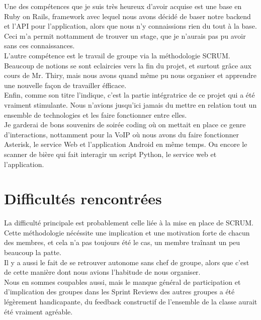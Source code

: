 \documentclass{report}
\begin{document}
	Une des compétences que je suis très heureux d'avoir acquise est une base en Ruby on Rails, framework avec lequel nous avons décidé de baser notre backend et l'API pour l'application, alors que nous n'y connaissions rien du tout à la base.\\
	Ceci m'a permit nottamment de trouver un stage, que je n'aurais pas pu avoir sans ces connaissances.\\

	L'autre compétence est le travail de groupe via la méthodologie SCRUM.\\
	Beaucoup de notions se sont eclaircies vers la fin du projet, et surtout grâce aux cours de Mr. Thiry, mais nous avons quand même pu nous organiser et apprendre une nouvelle façon de travailler éfficace.\\

	Enfin, comme son titre l'indique, c'est la partie intégratrice de ce projet qui a été vraiment stimulante. Nous n'avions jusqu'ici jamais du mettre en relation tout un ensemble de technologies et les faire fonctionner entre elles.\\
	Je garderai de bons souvenirs de soirée coding où on mettait en place ce genre d'interactions, nottamment pour la VoIP où nous avons du faire fonctionner Asterisk, le service Web et l'application Android en même temps. Ou encore le scanner de bière qui fait interagir un script Python, le service web et l'application.\\

\section{Difficultés rencontrées}

	La difficulté principale est probablement celle liée à la mise en place de SCRUM.\\
	Cette méthodologie nécéssite une implication et une motivation forte de chacun des membres, et cela n'a pas toujours été le cas, un membre traînant un peu beaucoup la patte.\\

	Il y a aussi le fait de se retrouver autonome sans chef de groupe, alors que c'est de cette manière dont nous avions l'habitude de nous organiser.\\

	Nous en sommes coupables aussi, mais le manque général de participation et d'implication des groupes dans les Sprint Reviews des autres groupes a été légèrement handicapante, du feedback constructif de l'ensemble de la classe aurait été vraiment agréable.\\
\end{document}
